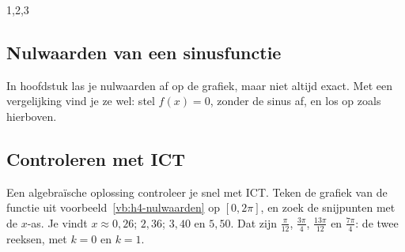 \begin{oefeningen}

\end{oefeningen}
\begin{alleenvoor}{1,2,3}

\subsection{Nulwaarden van een sinusfunctie}

In hoofdstuk  las je nulwaarden af op de grafiek, maar niet altijd exact. Met een vergelijking vind je ze wel: stel $f(x) = 0$, zonder de sinus af, en los op zoals hierboven.


\begin{oefeningen}
\end{oefeningen}

\subsection{Controleren met ICT}

Een algebraïsche oplossing controleer je snel met ICT. Teken de grafiek van de functie uit voorbeeld~\ref{vb:h4-nulwaarden} op $[0, 2\pi]$, en zoek de snijpunten met de $x$-as. Je vindt $x \approx 0{,}26$; $2{,}36$; $3{,}40$ en $5{,}50$. Dat zijn $\frac{\pi}{12}$, $\frac{3\pi}{4}$, $\frac{13\pi}{12}$ en $\frac{7\pi}{4}$: de twee reeksen, met $k = 0$ en $k = 1$.


\end{alleenvoor}
